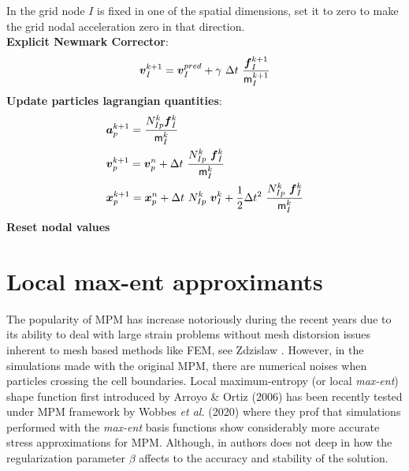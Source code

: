 \begin{algorithm}
\begin{algorithmic}[1]
    In the grid node $I$ is fixed in one of the spatial dimensions, set it to
    zero to make the grid nodal acceleration zero in that direction.\\
    \STATE \textbf{Explicit Newmark Corrector}:
    \begin{equation*}
      \vec{v}_{I}^{k+1} = \vec{v}_{I}^{pred} + \gamma\ \Delta t\ \frac{\vec{f}_{I}^{k+1}}{\tens{m}_I^{k+1}}  
    \end{equation*}
    \STATE \textbf{Update particles lagrangian quantities}:
    \begin{align*}
      &\vec{a}_p^{k+1} = \frac{N_{Ip}^k\vec{f}_{I}^{k}}{\tens{m}_I^k}\\
      &\vec{v}_p^{k+1} = \vec{v}_p^n + \Delta t\
        \frac{N_{Ip}^k\
        \vec{f}_{I}^{k}}{\tens{m}_I^k}\\
      &\vec{x}_p^{k+1} = \vec{x}_p^n + \Delta t\
         N_{Ip}^k\ \vec{v}_{I}^{k} +
        \frac{1}{2}\Delta t^2\ \frac{N_{Ip}^k\
        \vec{f}_{I}^{k}}{\tens{m}_I^k}
    \end{align*}
    \STATE \textbf{Reset nodal values}
  \end{algorithmic}
\end{algorithm} 


\section{Local max-ent approximants}
\label{sec:local-max-ent}
The popularity of MPM has increase notoriously during
the recent years due to its ability to deal with large strain problems
without mesh distorsion issues inherent to mesh based methods like
FEM, see Zdzislaw \cite{Wieckowski2004}. However, in the simulations
made with the original MPM, there are numerical noises when particles
crossing the cell boundaries. Local maximum-entropy (or
local \textit{max-ent}) shape function first introduced by Arroyo \&
Ortiz (2006)\cite{Arroyo2006} has been recently tested under MPM framework
by Wobbes {\it et al.} (2020)\cite{Wobbes2020} where they prof that
simulations performed with the \textit{max-ent} basis functions show
considerably more accurate stress approximations for MPM. Although, in
\cite{Wobbes2020} authors does not deep in how the regularization
parameter $\beta$ affects to the accuracy and stability of the solution.

